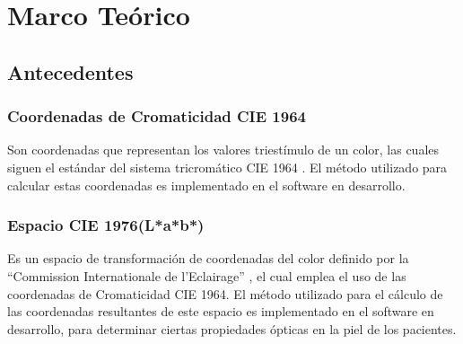 \documentclass[conference]{IEEEtran}
\renewcommand{\arraystretch}{1.3}
\begin{document}
%



\section{Marco Te\'{o}rico}

	\subsection{Antecedentes}
	
		\subsubsection{Coordenadas de Cromaticidad CIE 1964}
			Son coordenadas que representan los valores triest\'{i}mulo de un color, las cuales siguen el est\'{a}ndar del sistema tricrom\'{a}tico CIE 1964 \cite{CIE}. El m\'{e}todo utilizado para calcular estas coordenadas \cite{Schanda} es implementado en el software en desarrollo.
		
		\subsubsection{Espacio CIE 1976(L*a*b*)}
			Es un espacio de transformaci\'{o}n de coordenadas del color definido por la ``Commission Internationale de l'Eclairage'' \cite{CIE}, el cual emplea el uso de las coordenadas de Cromaticidad CIE 1964. El m\'{e}todo utilizado para el c\'{a}lculo de las coordenadas resultantes de este espacio \cite{Schanda} es implementado en el software en desarrollo, para determinar ciertas propiedades \'{o}pticas en la piel de los pacientes.
	
\end{document}
